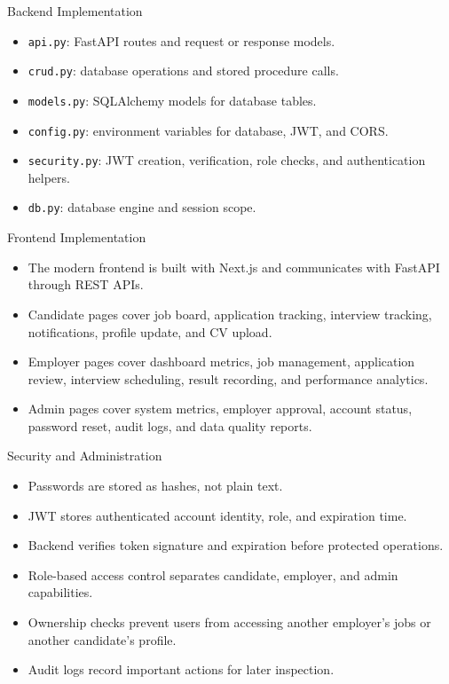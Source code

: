 \documentclass[aspectratio=169]{beamer}
\begin{document}
\begin{frame}{Backend Implementation}
  \begin{itemize}
    \item \texttt{api.py}: FastAPI routes and request or response models.
    \item \texttt{crud.py}: database operations and stored procedure calls.
    \item \texttt{models.py}: SQLAlchemy models for database tables.
    \item \texttt{config.py}: environment variables for database, JWT, and CORS.
    \item \texttt{security.py}: JWT creation, verification, role checks, and authentication helpers.
    \item \texttt{db.py}: database engine and session scope.
  \end{itemize}
\end{frame}

\begin{frame}{Frontend Implementation}
  \begin{itemize}
    \item The modern frontend is built with Next.js and communicates with FastAPI through REST APIs.
    \item Candidate pages cover job board, application tracking, interview tracking, notifications, profile update, and CV upload.
    \item Employer pages cover dashboard metrics, job management, application review, interview scheduling, result recording, and performance analytics.
    \item Admin pages cover system metrics, employer approval, account status, password reset, audit logs, and data quality reports.
  \end{itemize}
\end{frame}

\begin{frame}{Security and Administration}
  \begin{itemize}
    \item Passwords are stored as hashes, not plain text.
    \item JWT stores authenticated account identity, role, and expiration time.
    \item Backend verifies token signature and expiration before protected operations.
    \item Role-based access control separates candidate, employer, and admin capabilities.
    \item Ownership checks prevent users from accessing another employer's jobs or another candidate's profile.
    \item Audit logs record important actions for later inspection.
  \end{itemize}
\end{frame}
\end{document}
